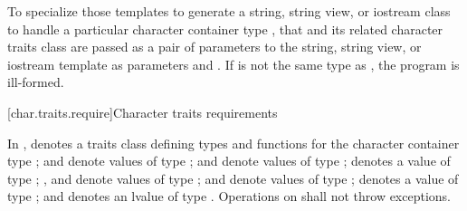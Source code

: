 \pnum
To specialize those templates to generate a string, string view, or
iostream class to handle a particular character container type
,
that and its related character traits class
are passed as a pair of parameters to the string, string view, or iostream template as
parameters
and
.
If
is not the same type as
, the program is ill-formed.

[char.traits.require]{Character traits requirements}

\pnum
In ,
denotes a traits class defining types and functions for the
character container type
;
and
denote values of type
;
and
denote values of type
;
denotes a value of type
;
,
and
denote values of type
;
and
denote values of type
;
denotes a value of type
;
and
denotes an lvalue of type
.
Operations on  shall not throw exceptions.

